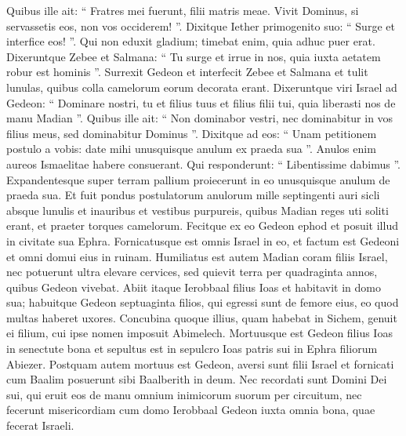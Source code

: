 \begin{biblechapter}
\begin{biblechapter}
\begin{biblechapter}
\begin{biblechapter}
\begin{biblechapter}
\begin{biblechapter}
\begin{biblechapter}
\begin{biblechapter}
\verse Quibus ille ait: “ Fratres mei fuerunt, filii matris meae. Vivit Dominus, si servassetis eos, non vos occiderem! ”. 
\verse Dixitque Iether primogenito suo: “ Surge et interfice eos! ”. Qui non eduxit gladium; timebat enim, quia adhuc puer erat. 
\verse Dixeruntque Zebee et Salmana: “ Tu surge et irrue in nos, quia iuxta aetatem robur est hominis ”. Surrexit Gedeon et interfecit Zebee et Salmana et tulit lunulas, quibus colla camelorum eorum decorata erant.
 \verse Dixeruntque viri Israel ad Gedeon: “ Dominare nostri, tu et filius tuus et filius filii tui, quia liberasti nos de manu Madian ”. 
\verse Quibus ille ait: “ Non dominabor vestri, nec dominabitur in vos filius meus, sed dominabitur Dominus ”. 
\verse Dixitque ad eos: “ Unam petitionem postulo a vobis: date mihi unusquisque anulum ex praeda sua ”. Anulos enim aureos Ismaelitae habere consuerant. 
\verse Qui responderunt: “ Libentissime dabimus ”. Expandentesque super terram pallium proiecerunt in eo unusquisque anulum de praeda sua. 
\verse Et fuit pondus postulatorum anulorum mille septingenti auri sicli absque lunulis et inauribus et vestibus purpureis, quibus Madian reges uti soliti erant, et praeter torques camelorum. 
\verse Fecitque ex eo Gedeon ephod et posuit illud in civitate sua Ephra. Fornicatusque est omnis Israel in eo, et factum est Gedeoni et omni domui eius in ruinam.
 \verse Humiliatus est autem Madian coram filiis Israel, nec potuerunt ultra elevare cervices, sed quievit terra per quadraginta annos, quibus Gedeon vivebat.
 \verse Abiit itaque Ierobbaal filius Ioas et habitavit in domo sua; 
\verse habuitque Gedeon septuaginta filios, qui egressi sunt de femore eius, eo quod multas haberet uxores. 
\verse Concubina quoque illius, quam habebat in Sichem, genuit ei filium, cui ipse nomen imposuit Abimelech.
 \verse Mortuusque est Gedeon filius Ioas in senectute bona et sepultus est in sepulcro Ioas patris sui in Ephra filiorum Abiezer.
 \verse Postquam autem mortuus est Gedeon, aversi sunt filii Israel et fornicati cum Baalim posuerunt sibi Baalberith in deum. 
\verse Nec recordati sunt Domini Dei sui, qui eruit eos de manu omnium inimicorum suorum per circuitum, 
\verse nec fecerunt misericordiam cum domo Ierobbaal Gedeon iuxta omnia bona, quae fecerat Israeli.
 

\end{biblechapter}
\end{biblechapter}
\end{biblechapter}
\end{biblechapter}
\end{biblechapter}
\end{biblechapter}
\end{biblechapter}
\end{biblechapter}
